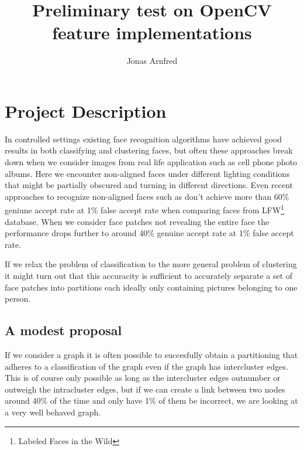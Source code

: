 \documentclass{article}
\begin{document}
\title{Preliminary test on OpenCV feature implementations}
\author{Jonas Arnfred}

\maketitle

\begin{abstract}
\end{abstract}

\section{Project Description} 
In controlled settings existing face recognition
algorithms have achieved good results in both classifying and clustering faces,
but often these approaches break down when we consider images from real life 
application such as cell phone photo albums. Here we encounter non-aligned 
faces under different lighting conditions that might be partially obscured and 
turning in different directions. Even recent approaches to recognize 
non-aligned faces such as \cite[pp 9.]{liao2011} don't achieve more than 60\% 
geniune accept rate at 1\% false accept rate when comparing faces from 
LFW\footnote{Labeled Faces in the Wild} database. When we consider face patches 
not revealing the entire face the performance drops further to around 40\% 
genuine accept rate at 1\% false accept rate.

If we relax the problem of classification to the more general problem of 
clustering it might turn out that this accuracity is sufficient to accurately 
separate a set of face patches into partitions each ideally only containing 
pictures belonging to one person.

\subsection{A modest proposal}
%
%
If we consider a graph it is often possible to succesfully obtain a 
partitioning that adheres to a classification of the graph even if the graph 
has intercluster edges. This is of course only possible as long as the 
intercluster edges outnumber or outweigh the intracluster edges, but if we can 
create a link between two nodes around 40\% of the time and only have 1\% of 
them be incorrect, we are looking at a very well behaved graph.
\end{document}
